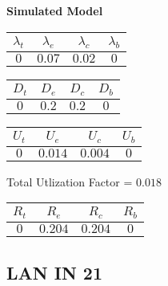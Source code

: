 \documentclass{article}
\begin{document}
\begin{minipage}{0.5\textwidth}
\centering	\textbf{Simulated Model}
\begin{table}[H]
\centering
\begin{tabular}{@{}cccc@{}}
\toprule
$\lambda_t$ & $\lambda_e$ & $\lambda_c$ & $\lambda_b$\\
\midrule
$0$ & $0.07$ & $0.02$ & $0$\\
\bottomrule
\end{tabular}
\end{table}
\begin{table}[H]
\centering
\begin{tabular}{@{}cccc@{}}
\toprule
$D_t$ & $D_e$ & $D_c$ & $D_b$\\
\midrule
$0$ & $0.2$ & $0.2$ & $0$\\
\bottomrule
\end{tabular}
\end{table}\begin{table}[H]
\centering
\begin{tabular}{@{}cccc@{}}
\toprule
$U_t$ & $U_e$ & $U_c$ & $U_b$\\
\midrule
$0$ & $0.014$ & $0.004$ & $0$\\
\bottomrule
\end{tabular}
\end{table}
\centering Total Utlization Factor = $0.018$
\begin{table}[H]
\centering
\begin{tabular}{@{}cccc@{}}
\toprule
$R_t$ & $R_e$ & $R_c$ & $R_b$\\
\midrule
$0$ & $0.204$ & $0.204$ & $0$\\
\bottomrule
\end{tabular}
\end{table}
\end{minipage}\subsection{LAN IN 21}
\end{document}
